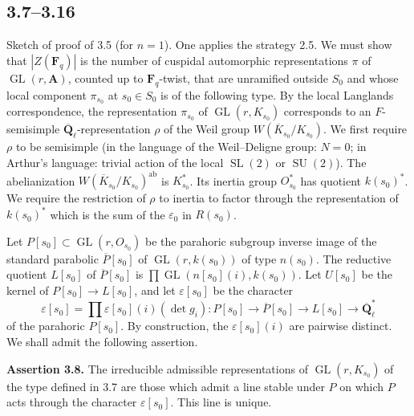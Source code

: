 \documentclass[11pt]{article}
\newcommand{\Qbar}{\overline{\mathbf Q}}
\newcommand{\Fq}{\mathbf F_q}
\newcommand{\A}{\mathbf A}
\newcommand{\GL}{\operatorname{GL}}
\begin{document}
\subsection{3.7--3.16}
Sketch of proof of 3.5 (for \(n=1\)). One applies the strategy 2.5. We must show that \(|Z(\Fq)|\) is the number of cuspidal automorphic representations \(\pi\) of \(\GL(r,\A)\), counted up to \(\Fq\)-twist, that are unramified outside \(S_0\) and whose local component \(\pi_{s_0}\) at \(s_0\in S_0\) is of the following type. By the local Langlands correspondence, the representation \(\pi_{s_0}\) of \(\GL(r,K_{s_0})\) corresponds to an \(F\)-semisimple \(\Qbar_\ell\)-representation \(\rho\) of the Weil group \(W(\overline K_{s_0}/K_{s_0})\). We first require \(\rho\) to be semisimple (in the language of the Weil--Deligne group: \(N=0\); in Arthur's language: trivial action of the local \(\operatorname{SL}(2)\) or \(\operatorname{SU}(2)\)). The abelianization \(W(\overline K_{s_0}/K_{s_0})^{\mathrm{ab}}\) is \(K_{s_0}^*\). Its inertia group \(O_{s_0}^*\) has quotient \(k(s_0)^*\). We require the restriction of \(\rho\) to inertia to factor through the representation of \(k(s_0)^*\) which is the sum of the \(\varepsilon_0\) in \(R(s_0)\).

Let \(P[s_0]\subset\GL(r,O_{s_0})\) be the parahoric subgroup inverse image of the standard parabolic \(\overline P[s_0]\) of \(\GL(r,k(s_0))\) of type \(n(s_0)\). The reductive quotient \(L[s_0]\) of \(\overline P[s_0]\) is \(\prod \GL(n[s_0](i),k(s_0))\). Let \(U[s_0]\) be the kernel of \(P[s_0]\to L[s_0]\), and let \(\varepsilon[s_0]\) be the character
\[
\varepsilon[s_0]=\prod \varepsilon[s_0](i)(\det g_i): P[s_0]\to\overline P[s_0]\to L[s_0]\to\Qbar_\ell^*
\]
of the parahoric \(P[s_0]\). By construction, the \(\varepsilon[s_0](i)\) are pairwise distinct. We shall admit the following assertion.

\textbf{Assertion 3.8.} The irreducible admissible representations of \(\GL(r,K_{s_0})\) of the type defined in 3.7 are those which admit a line stable under \(P\) on which \(P\) acts through the character \(\varepsilon[s_0]\). This line is unique.
\end{document}
